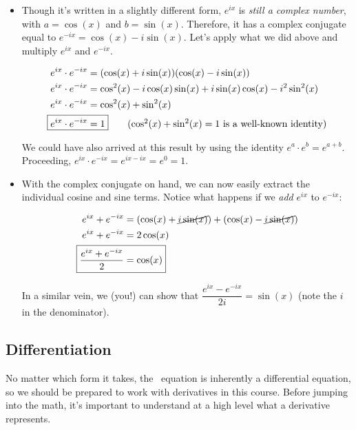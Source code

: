 \begin{itemize}
	\item Though it's written in a slightly different form, $e^{ix}$ is \emph{still a complex number}, with $a = \cos(x)$ and $b = \sin(x)$. 
	Therefore, it has a complex conjugate equal to $e^{-ix}=\cos(x) -i\sin(x)$. 
	Let's apply what we did above and multiply $e^{ix}$ and $e^{-ix}$.
	
	\begin{align*}
	e^{ix} \cdot e^{-ix} &= (\cos(x) + i\sin(x))(\cos(x)-i\sin(x)) \\
	e^{ix} \cdot e^{-ix} &= \cos^2(x) -i\cos(x)\sin(x) + i\sin(x)\cos(x) -i^2\sin^2(x) \\
	e^{ix} \cdot e^{-ix} &= \cos^2(x) + \sin^2(x) \\
	\Aboxed{e^{ix} \cdot e^{-ix} &= 1} \tag{$\cos^2(x) + \sin^2(x) = 1$ is a well-known identity}
	\end{align*}
	
	We could have also arrived at this result by using the identity $e^a \cdot e^b = e^{a+b}$. 
	Proceeding, $e^{ix} \cdot e^{-ix} = e^{ix - ix} = e^0 = 1$.
	
	\item With the complex conjugate on hand, we can now easily extract the individual cosine and sine terms. 
	Notice what happens if we \emph{add} $e^{ix}$ to $e^{-ix}$:
	
	\begin{align*}
	e^{ix} + e^{-ix} &= (\cos(x) + \cancel{i\sin(x)}) + (\cos(x) - \cancel{i\sin(x)}) \\
	e^{ix} + e^{-ix} &= 2\cos(x) \\
	\Aboxed{ \dfrac{e^{ix} + e^{-ix}}{2}&= \cos(x) }
	\end{align*}
	
	In a similar vein, we (you!) can show that $\boxed{\dfrac{e^{ix} - e^{-ix}}{2i} = \sin(x)}$ (note the $i$ in the denominator).
	
\end{itemize}


\subsection{Differentiation} \label{sec:calculus-diff}

No matter which form it takes, the \Sch\ equation is inherently a differential equation, so we should be prepared to work with derivatives in this course. 
Before jumping into the math, it's important to understand at a high level what a derivative represents.

